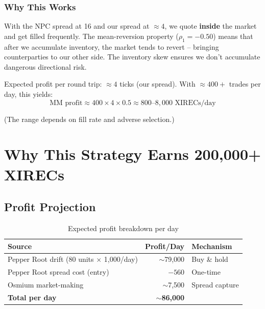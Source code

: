 \documentclass[11pt,a4paper]{article}
\begin{document}
\subsubsection{Why This Works}

With the NPC spread at 16 and our spread at $\approx 4$, we quote \textbf{inside} the market and get filled frequently. The mean-reversion property ($\rho_1 = -0.50$) means that after we accumulate inventory, the market tends to revert -- bringing counterparties to our other side. The inventory skew ensures we don't accumulate dangerous directional risk.

Expected profit per round trip: $\approx 4$ ticks (our spread). With $\approx 400{+}$ trades per day, this yields:
\begin{equation}
    \text{MM profit} \approx 400 \times 4 \times 0.5 \approx 800\text{--}8{,}000 \text{ XIRECs/day}
\end{equation}

(The range depends on fill rate and adverse selection.)

\section{Why This Strategy Earns 200,000+ XIRECs}

\subsection{Profit Projection}

\begin{table}[H]
\centering
\caption{Expected profit breakdown per day}
\begin{tabular}{@{}lrl@{}}
\toprule
\textbf{Source} & \textbf{Profit/Day} & \textbf{Mechanism} \\
\midrule
Pepper Root drift (80 units $\times$ 1,000/day) & $\sim$79,000 & Buy \& hold \\
Pepper Root spread cost (entry)                  & $-560$       & One-time \\
Osmium market-making                             & $\sim$7,500  & Spread capture \\
\midrule
\textbf{Total per day}                           & $\sim$\textbf{86,000} & \\
\bottomrule
\end{tabular}
\end{table}
\end{document}
